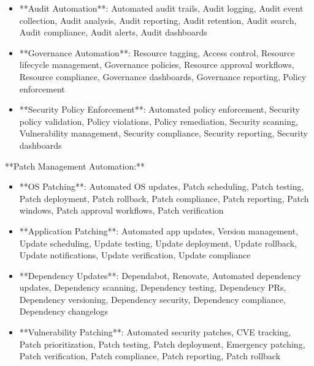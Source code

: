 \documentclass[11pt,a4paper]{article}
\begin{document}
\begin{itemize}
\item **Audit Automation**: Automated audit trails, Audit logging, Audit event collection, Audit analysis, Audit reporting, Audit retention, Audit search, Audit compliance, Audit alerts, Audit dashboards
\end{itemize}

\begin{itemize}
\item **Governance Automation**: Resource tagging, Access control, Resource lifecycle management, Governance policies, Resource approval workflows, Resource compliance, Governance dashboards, Governance reporting, Policy enforcement
\end{itemize}

\begin{itemize}
\item **Security Policy Enforcement**: Automated policy enforcement, Security policy validation, Policy violations, Policy remediation, Security scanning, Vulnerability management, Security compliance, Security reporting, Security dashboards
\end{itemize}

**Patch Management Automation:**

\begin{itemize}
\item **OS Patching**: Automated OS updates, Patch scheduling, Patch testing, Patch deployment, Patch rollback, Patch compliance, Patch reporting, Patch windows, Patch approval workflows, Patch verification
\end{itemize}

\begin{itemize}
\item **Application Patching**: Automated app updates, Version management, Update scheduling, Update testing, Update deployment, Update rollback, Update notifications, Update verification, Update compliance
\end{itemize}

\begin{itemize}
\item **Dependency Updates**: Dependabot, Renovate, Automated dependency updates, Dependency scanning, Dependency testing, Dependency PRs, Dependency versioning, Dependency security, Dependency compliance, Dependency changelogs
\end{itemize}

\begin{itemize}
\item **Vulnerability Patching**: Automated security patches, CVE tracking, Patch prioritization, Patch testing, Patch deployment, Emergency patching, Patch verification, Patch compliance, Patch reporting, Patch rollback
\end{itemize}
\end{document}
